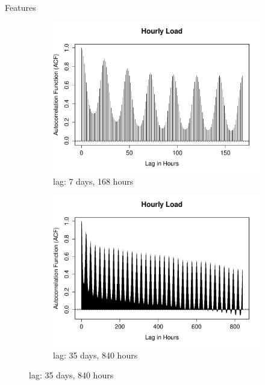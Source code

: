 \documentclass{beamer}
\begin{document}
\begin{frame}{Features}
\begin{figure}[!ht]
\begin{subfigure}[b]{.4\linewidth}
\includegraphics[width=\linewidth]{../report/gfx/acf-load-7days.pdf}
\caption{lag: 7 days, 168 hours}
\label{subfig:acf-load-7days}
\end{subfigure}
\begin{subfigure}[b]{.4\linewidth}
\includegraphics[width=\linewidth]{../report/gfx/acf-load-35days.pdf}
\caption{lag: 35 days, 840 hours}
\label{subfig:acf-load-35days}
\end{subfigure}
\label{fig:acf-load}
\end{figure}
\end{frame}

\end{document}
